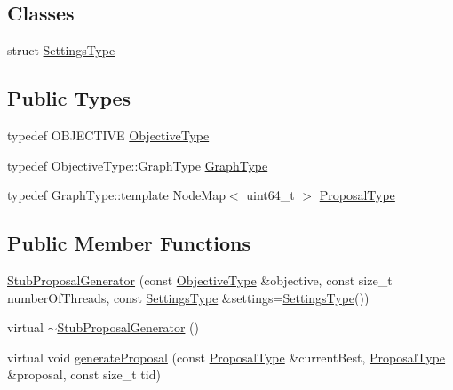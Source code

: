 \subsection*{Classes}
\begin{DoxyCompactItemize}
\item 
struct \hyperlink{structnifty_1_1graph_1_1opt_1_1common_1_1StubProposalGenerator_1_1SettingsType}{Settings\+Type}
\end{DoxyCompactItemize}
\subsection*{Public Types}
\begin{DoxyCompactItemize}
\item 
typedef O\+B\+J\+E\+C\+T\+I\+VE \hyperlink{classnifty_1_1graph_1_1opt_1_1common_1_1StubProposalGenerator_a1f69fccabf6f79294d35a1ea47261f3a}{Objective\+Type}
\item 
typedef Objective\+Type\+::\+Graph\+Type \hyperlink{classnifty_1_1graph_1_1opt_1_1common_1_1StubProposalGenerator_a50a71857377f3e6c9302c49be68f5bb1}{Graph\+Type}
\item 
typedef Graph\+Type\+::template Node\+Map$<$ uint64\+\_\+t $>$ \hyperlink{classnifty_1_1graph_1_1opt_1_1common_1_1StubProposalGenerator_a4f7a3ed62a28570d127b6bb1911373f7}{Proposal\+Type}
\end{DoxyCompactItemize}
\subsection*{Public Member Functions}
\begin{DoxyCompactItemize}
\item 
\hyperlink{classnifty_1_1graph_1_1opt_1_1common_1_1StubProposalGenerator_a7d69f6a11a22bbc87dc87432d3189e3a}{Stub\+Proposal\+Generator} (const \hyperlink{classnifty_1_1graph_1_1opt_1_1common_1_1StubProposalGenerator_a1f69fccabf6f79294d35a1ea47261f3a}{Objective\+Type} \&objective, const size\+\_\+t number\+Of\+Threads, const \hyperlink{structnifty_1_1graph_1_1opt_1_1common_1_1StubProposalGenerator_1_1SettingsType}{Settings\+Type} \&settings=\hyperlink{structnifty_1_1graph_1_1opt_1_1common_1_1StubProposalGenerator_1_1SettingsType}{Settings\+Type}())
\item 
virtual \hyperlink{classnifty_1_1graph_1_1opt_1_1common_1_1StubProposalGenerator_adfac393e8c0cd4fbe891772e8ceaf864}{$\sim$\+Stub\+Proposal\+Generator} ()
\item 
virtual void \hyperlink{classnifty_1_1graph_1_1opt_1_1common_1_1StubProposalGenerator_a38c36aac9cf548bbc9871ccb865709d7}{generate\+Proposal} (const \hyperlink{classnifty_1_1graph_1_1opt_1_1common_1_1ProposalGeneratorBase_a122993da5c326628cdb865a6279d20c5}{Proposal\+Type} \&current\+Best, \hyperlink{classnifty_1_1graph_1_1opt_1_1common_1_1ProposalGeneratorBase_a122993da5c326628cdb865a6279d20c5}{Proposal\+Type} \&proposal, const size\+\_\+t tid)
\end{DoxyCompactItemize}


